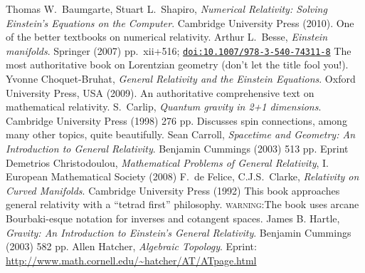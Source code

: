 \renewcommand{\leftmark}{References}
\renewcommand\refname{Books}
\begin{thebibliography}{99}\addcontentsline{toc}{subsection}{\refname}
  Thomas W.\ Baumgarte, Stuart L.\ Shapiro,\newblock
  \emph{Numerical Relativity: Solving Einstein's Equations on the Computer}.\newblock
  Cambridge University Press (2010).\newblock
  One of the better textbooks on numerical relativity.
  Arthur L.~Besse,\newblock
  \emph{Einstein manifolds}.\newblock
  Springer (2007) pp.~xii+516; \href{http://dx.doi.org/10.1007/978-3-540-74311-8}{\tt doi:10.1007/978-3-540-74311-8}\newblock
  The most authoritative book on Lorentzian geometry (don't let
  the title fool you!).
  Yvonne Choquet-Bruhat,\newblock
  \emph{General Relativity and the Einstein Equations}.\newblock
  Oxford University Press, USA (2009).\newblock
  An authoritative comprehensive text on mathematical relativity.
  S.~Carlip,\newblock
  \emph{Quantum gravity in 2+1 dimensions}.\newblock
  Cambridge University Press (1998) 276 pp.\newblock
  Discusses spin connections, among many other topics, quite beautifully.
  Sean Carroll,\newblock
  \emph{Spacetime and Geometry: An Introduction to General Relativity}.\newblock
  Benjamin Cummings (2003) 513 pp.
  Eprint 
  Demetrios Christodoulou,\newblock
  \emph{Mathematical Problems of General Relativity}, I.\newblock
  European Mathematical Society (2008)
  F.\ de Felice, C.J.S.\ Clarke,\newblock
  \emph{Relativity on Curved Manifolds}.\newblock
  Cambridge University Press (1992)\newblock
  This book approaches general relativity with a ``tetrad first''
  philosophy.\newblock 
  \textsc{warning:\quad}\ignorespaces The book uses arcane
  Bourbaki-esque notation for inverses and cotangent spaces.
  James B. Hartle,\newblock
  \emph{Gravity: An Introduction to Einstein's General Relativity}.\newblock
  Benjamin Cummings (2003) 582 pp.
  Allen Hatcher,\newblock
  \emph{Algebraic Topology}.\newblock
  Eprint: \url{http://www.math.cornell.edu/~hatcher/AT/ATpage.html}

\end{thebibliography}
